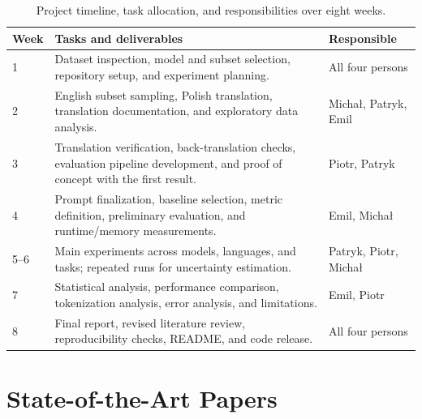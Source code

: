 \documentclass[11pt]{article}
\begin{document}
\begin{table}[t]
\centering
\footnotesize
\renewcommand{\arraystretch}{1.2}
\begin{tabular}{p{} p{} p{}}
\hline
\textbf{Week} & \textbf{Tasks and deliverables} & \textbf{Responsible} \\
\hline
1 &
Dataset inspection, model and subset selection, repository setup, and experiment planning. &
All four persons \\

\hline
2 &
English subset sampling, Polish translation, translation documentation, and exploratory data analysis. &
Michał, Patryk, Emil \\

\hline
3 &
Translation verification, back-translation checks, evaluation pipeline development, and proof of concept with the first result. &
Piotr, Patryk \\

\hline
4 &
Prompt finalization, baseline selection, metric definition, preliminary evaluation, and runtime/memory measurements. &
Emil, Michał \\

\hline
5--6 &
Main experiments across models, languages, and tasks; repeated runs for uncertainty estimation. &
Patryk, Piotr, Michał \\

\hline
7 &
Statistical analysis, performance comparison, tokenization analysis, error analysis, and limitations. &
Emil, Piotr \\

\hline
8 &
Final report, revised literature review, reproducibility checks, README, and code release. &
All four persons \\
\hline
\end{tabular}
\caption{Project timeline, task allocation, and responsibilities over eight weeks.}
\label{tab:project_timeline}
\end{table}

\section{State-of-the-Art Papers}
\end{document}
